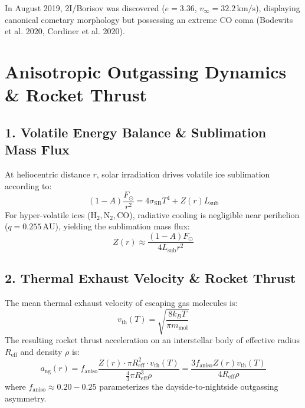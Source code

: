 \documentclass[11pt,a4paper]{article}
\begin{document}
In August 2019, 2I/Borisov was discovered ($e = 3.36$, $v_\infty = 32.2\,\mathrm{km/s}$), displaying canonical cometary morphology but possessing an extreme CO coma (Bodewits et al. 2020, Cordiner et al. 2020).

\section{Anisotropic Outgassing Dynamics \& Rocket Thrust}

\subsection{1. Volatile Energy Balance \& Sublimation Mass Flux}
At heliocentric distance $r$, solar irradiation drives volatile ice sublimation according to:
\begin{equation}
(1 - A) \frac{F_\odot}{r^2} = 4 \sigma_{\text{SB}} T^4 + Z(r) L_{\text{sub}}
\end{equation}
For hyper-volatile ices ($\mathrm{H_2}, \mathrm{N_2}, \mathrm{CO}$), radiative cooling is negligible near perihelion ($q = 0.255\,\mathrm{AU}$), yielding the sublimation mass flux:
\begin{equation}
Z(r) \approx \frac{(1 - A) F_\odot}{4 L_{\text{sub}} r^2}
\end{equation}

\subsection{2. Thermal Exhaust Velocity \& Rocket Thrust}
The mean thermal exhaust velocity of escaping gas molecules is:
\begin{equation}
v_{\text{th}}(T) = \sqrt{ \frac{8 k_B T}{\pi m_{\text{mol}}} }
\end{equation}
The resulting rocket thrust acceleration on an interstellar body of effective radius $R_{\text{eff}}$ and density $\rho$ is:
\begin{equation}
a_{\text{ng}}(r) = f_{\text{aniso}} \frac{Z(r) \cdot \pi R_{\text{eff}}^2 \cdot v_{\text{th}}(T)}{ \frac{4}{3} \pi R_{\text{eff}}^3 \rho } = \frac{3 f_{\text{aniso}} Z(r) v_{\text{th}}(T)}{4 R_{\text{eff}} \rho}
\end{equation}
where $f_{\text{aniso}} \approx 0.20 - 0.25$ parameterizes the dayside-to-nightside outgassing asymmetry.
\end{document}
